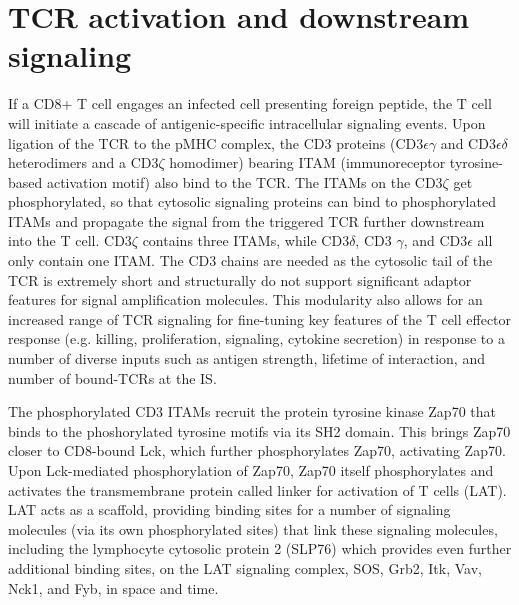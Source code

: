 \section{TCR activation and downstream signaling}
If a CD8+ T cell engages an infected cell presenting foreign peptide, the T cell will initiate a cascade of antigenic-specific intracellular signaling events. Upon ligation of the TCR to the pMHC complex, the CD3 proteins (CD3$\epsilon \gamma$ and CD3$\epsilon \delta$ heterodimers and a CD3$\zeta$ homodimer) bearing ITAM (immunoreceptor tyrosine-based activation motif) also bind to the TCR.  The ITAMs on the CD3$\zeta$ get phosphorylated, so that cytosolic signaling proteins can bind to phosphorylated ITAMs and propagate the signal from the triggered TCR further downstream into the T cell. CD3$\zeta$ contains three ITAMs, while CD3$\delta$, CD3 $\gamma$, and CD3$\epsilon$ all only contain one ITAM. The CD3 chains are needed as the cytosolic tail of the TCR is extremely short and structurally do not support significant adaptor features for signal amplification molecules. This modularity also allows for an increased range of TCR signaling for fine-tuning key features of the T cell effector response (e.g. killing, proliferation, signaling, cytokine secretion) in response to a number of diverse inputs such as antigen strength, lifetime of interaction, and number of bound-TCRs at the IS.

The phosphorylated CD3 ITAMs recruit the protein tyrosine kinase Zap70 that binds to the phoshorylated tyrosine motifs via its SH2 domain.  This brings Zap70 closer to CD8-bound Lck, which further phosphorylates Zap70, activating Zap70. Upon Lck-mediated phosphorylation of Zap70,  Zap70 itself phosphorylates and activates the transmembrane protein called linker for activation of T cells (LAT). LAT acts as a scaffold, providing binding sites for a number of signaling molecules (via its own phosphorylated sites) that link these signaling molecules, including the lymphocyte cytosolic protein 2 (SLP76) which provides even further additional binding sites, on the LAT signaling complex, SOS,  Grb2, Itk, Vav, Nck1, and Fyb, in space and time.  

